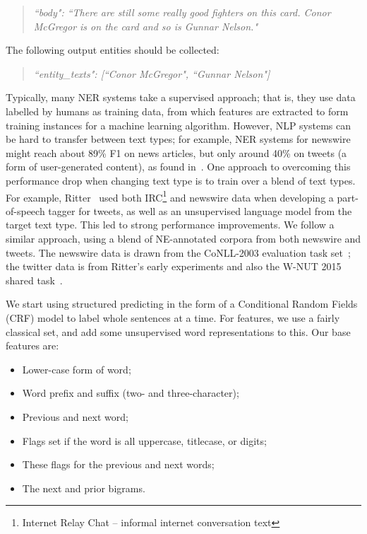 \documentclass[review]{elsarticle}
\begin{document}
\begin{quote}
\emph{``body": ``There are still some really good fighters on this card. Conor McGregor is on the card and so is Gunnar Nelson."}
\end{quote}

The following output entities should be collected:

\begin{quote}
\emph{``entity\_texts": [``Conor McGregor", ``Gunnar Nelson"]}
\end{quote}

Typically, many NER systems take a supervised approach; that is, they use data labelled by humans as training data, from which features are extracted to form training instances for a machine learning algorithm.
However, NLP systems can be hard to transfer between text types; for example, NER systems for newswire might reach about 89\% F1 on news articles, but only around 40\% on tweets (a form of user-generated content), as found in~\cite{derczynski2015analysis}.
One approach to overcoming this performance drop when changing text type is to train over a blend of text types.
For example, Ritter~\cite{ritter2011named} used both IRC\footnote{Internet Relay Chat -- informal internet conversation text} and newswire data when developing a part-of-speech tagger for tweets, as well as an unsupervised language model from the target text type.
This led to strong performance improvements.
We follow a similar approach, using a blend of NE-annotated corpora from both newswire and tweets.
The newswire data is drawn from the CoNLL-2003 evaluation task set~\cite{tjong2003introduction}; the twitter data is from Ritter's early experiments and also the W-NUT 2015 shared task~\cite{ritter2011named,baldwin2015shared}.

We start using structured predicting in the form of a Conditional Random Fields (CRF) model to label whole sentences at a time.
For features, we use a fairly classical set, and add some unsupervised word representations to this.
Our base features are:

\begin{itemize}
\item Lower-case form of word;
\item Word prefix and suffix (two- and three-character);
\item Previous and next word;
\item Flags set if the word is all uppercase, titlecase, or digits;
\item These flags for the previous and next words;
\item The next and prior bigrams.
\end{itemize}
\end{document}

